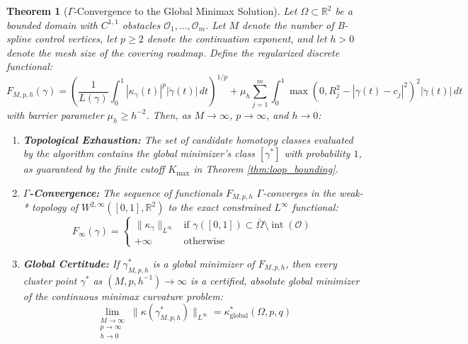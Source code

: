 \documentclass[11pt,reqno]{amsart}
\newtheorem{theorem}{Theorem}[section]
\theoremstyle{definition}
\providecommand{\R}{\mathbb{R}}
\numberwithin{equation}{section}
\providecommand{\R}{\mathbb{R}}
\begin{document}
\begin{theorem}[$\Gamma$-Convergence to the Global Minimax Solution]
\label{thm:gamma_convergence}
Let $\Omega \subset \R^2$ be a bounded domain with $C^{1,1}$ obstacles $\mathcal{O}_1, \dots, \mathcal{O}_m$. Let $M$ denote the number of B-spline control vertices, let $p \ge 2$ denote the continuation exponent, and let $h > 0$ denote the mesh size of the covering roadmap.
Define the regularized discrete functional:
\begin{equation}
F_{M, p, h}(\gamma) = \left( \frac{1}{L(\gamma)} \int_0^1 |\kappa_\gamma(t)|^p |\dot{\gamma}(t)|\,dt \right)^{1/p} + \mu_h \sum_{j=1}^m \int_0^1 \max\left(0, R_j^2 - |\gamma(t) - c_j|^2\right)^2 |\dot{\gamma}(t)|\,dt
\end{equation}
with barrier parameter $\mu_h \ge h^{-2}$.
Then, as $M \to \infty$, $p \to \infty$, and $h \to 0$:
\begin{enumerate}
    \item \textbf{Topological Exhaustion:} The set of candidate homotopy classes evaluated by the algorithm contains the global minimizer's class $[\gamma^*]$ with probability $1$, as guaranteed by the finite cutoff $K_{\max}$ in Theorem \ref{thm:loop_bounding}.
    \item \textbf{$\Gamma$-Convergence:} The sequence of functionals $F_{M, p, h}$ $\Gamma$-converges in the weak-* topology of $W^{2,\infty}([0, 1], \R^2)$ to the exact constrained $L^\infty$ functional:
    \begin{equation}
    F_\infty(\gamma) = \begin{cases}
    \|\kappa_\gamma\|_{L^\infty} & \text{if } \gamma([0, 1]) \subset \bar{\Omega} \setminus \operatorname{int}(\mathcal{O}) \\
    +\infty & \text{otherwise}
    \end{cases}
    \end{equation}
    \item \textbf{Global Certitude:} If $\gamma^*_{M, p, h}$ is a global minimizer of $F_{M, p, h}$, then every cluster point $\gamma^*$ as $(M, p, h^{-1}) \to \infty$ is a certified, absolute global minimizer of the continuous minimax curvature problem:
    \begin{equation}
    \lim_{\substack{M \to \infty \\ p \to \infty \\ h \to 0}} \|\kappa(\gamma^*_{M, p, h})\|_{L^\infty} = \kappa^*_{\mathrm{global}}(\Omega, p, q)
    \end{equation}
\end{enumerate}
\end{theorem}
\end{document}
